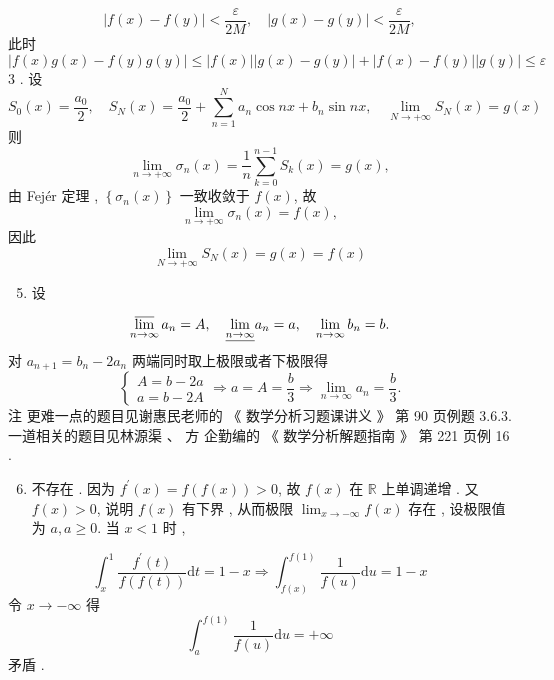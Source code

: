 \documentclass[10pt]{article}
\begin{document}
$$
|f(x)-f(y)|<\frac{\varepsilon}{2 M}, \quad|g(x)-g(y)|<\frac{\varepsilon}{2 M},
$$
 此时 
$$
|f(x) g(x)-f(y) g(y)| \leqslant|f(x)||g(x)-g(y)|+|f(x)-f(y)||g(y)| \leqslant \varepsilon
$$
3 .  设 
$$
S_{0}(x)=\frac{a_{0}}{2}, \quad S_{N}(x)=\frac{a_{0}}{2}+\sum_{n=1}^{N} a_{n} \cos n x+b_{n} \sin n x, \quad \lim _{N \rightarrow+\infty} S_{N}(x)=g(x)
$$
 则 
$$
\lim _{n \rightarrow+\infty} \sigma_{n}(x)=\frac{1}{n} \sum_{k=0}^{n-1} S_{k}(x)=g(x),
$$
 由  Fejér  定理 , $\left\{\sigma_{n}(x)\right\}$  一致收敛于  $f(x)$,  故 
$$
\lim _{n \rightarrow+\infty} \sigma_{n}(x)=f(x),
$$
 因此 
$$
\lim _{N \rightarrow+\infty} S_{N}(x)=g(x)=f(x)
$$

\begin{enumerate}
  \setcounter{enumi}{4}
  \item  设 
\end{enumerate}
$$
\varlimsup_{n \rightarrow \infty} a_{n}=A, \quad \underline{\lim _{n \rightarrow \infty}} a_{n}=a, \quad \lim _{n \rightarrow \infty} b_{n}=b .
$$
 对  $a_{n+1}=b_{n}-2 a_{n}$  两端同时取上极限或者下极限得 
$$
\left\{\begin{array}{l}
A=b-2 a \\
a=b-2 A
\end{array} \Longrightarrow a=A=\frac{b}{3} \Longrightarrow \lim _{n \rightarrow \infty} a_{n}=\frac{b}{3} .\right.
$$
 注   更难一点的题目见谢惠民老师的 《 数学分析习题课讲义 》 第  90  页例题  3.6.3.  一道相关的题目见林源渠 、 方   企勤编的 《 数学分析解题指南 》 第  221  页例  16 .

\begin{enumerate}
  \setcounter{enumi}{5}
  \item  不存在 .  因为  $f^{\prime}(x)=f(f(x))>0$,  故  $f(x)$  在  $\mathbb{R}$  上单调递增 .  又  $f(x)>0$,  说明  $f(x)$  有下界 ,  从而极限  $\lim _{x \rightarrow-\infty} f(x)$  存在 ,  设极限值为  $a, a \geqslant 0$.  当  $x<1$  时 ,
\end{enumerate}
$$
\int_{x}^{1} \frac{f^{\prime}(t)}{f(f(t))} \mathrm{d} t=1-x \Longrightarrow \int_{f(x)}^{f(1)} \frac{1}{f(u)} \mathrm{d} u=1-x
$$
 令  $x \rightarrow-\infty$  得 
$$
\int_{a}^{f(1)} \frac{1}{f(u)} \mathrm{d} u=+\infty
$$
 矛盾 .
\end{document}
